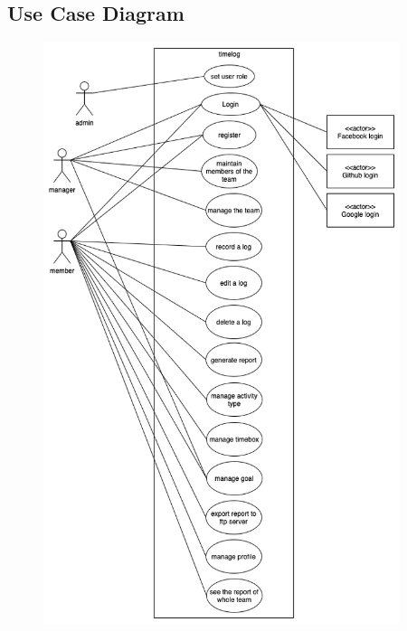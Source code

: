\documentclass[12pt, a4paper]{article}
\begin{document}
\begin{CJK*}{UTF8}{bkai}
  \subsection{Use Case Diagram}
    \begin{figure}[!htbp]
      \centering
      \includegraphics[height=17cm]{img/usecase_diagram/Usecase_diagram.png}
    \end{figure}
    \newpage


\end{CJK*}
\end{document}

